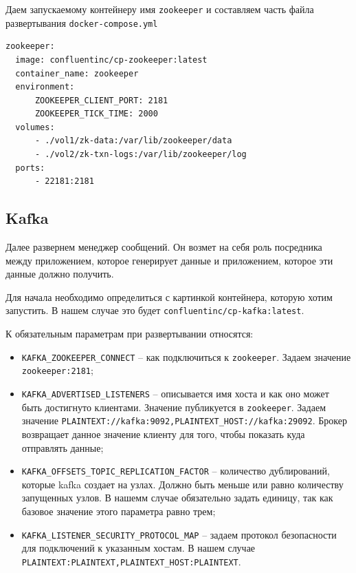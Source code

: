 Даем запускаемому контейнеру имя \verb|zookeeper| и составляем часть файла
развертывания \verb|docker-compose.yml|
\begin{verbatim}
zookeeper:
  image: confluentinc/cp-zookeeper:latest
  container_name: zookeeper
  environment:
      ZOOKEEPER_CLIENT_PORT: 2181
      ZOOKEEPER_TICK_TIME: 2000
  volumes:
      - ./vol1/zk-data:/var/lib/zookeeper/data
      - ./vol2/zk-txn-logs:/var/lib/zookeeper/log
  ports:
      - 22181:2181
\end{verbatim}


\subsection{Kafka}
Далее развернем менеджер сообщений. Он возмет на себя роль посредника между
приложением, которое генерирует данные и приложением, которое эти данные должно
получить.

Для начала необходимо определиться с картинкой контейнера, которую хотим
запустить. В нашем случае это будет \verb|confluentinc/cp-kafka:latest|.

К обязательным параметрам при развертывании относятся:
\begin{itemize}
    \item \verb|KAFKA_ZOOKEEPER_CONNECT| -- как подключиться к \verb|zookeeper|.
        Задаем значение \verb|zookeeper:2181|;
    \item \verb|KAFKA_ADVERTISED_LISTENERS| -- описывается имя хоста и как оно
        может быть достигнуто клиентами. Значение публикуется в
        \verb|zookeeper|. Задаем значение
        \verb|PLAINTEXT://kafka:9092,PLAINTEXT_HOST://kafka:29092|. Брокер
        возвращает данное значение клиенту для того, чтобы показать куда
        отправлять данные;
    \item \verb|KAFKA_OFFSETS_TOPIC_REPLICATION_FACTOR| -- количество
        дублирований, которые kafka создает на узлах. Должно быть меньше или
        равно количеству запущенных узлов. В нашемм случае обязательно задать
        единицу, так как базовое значение этого параметра равно трем;
    \item \verb|KAFKA_LISTENER_SECURITY_PROTOCOL_MAP| -- задаем протокол
        безопасности для подключений к указанным хостам. В нашем случае
        \verb|PLAINTEXT:PLAINTEXT,PLAINTEXT_HOST:PLAINTEXT|.
\end{itemize}

